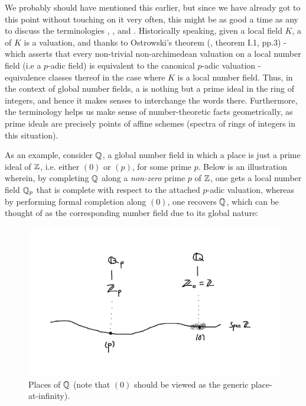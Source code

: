                 \begin{convention} \label{conv: places_and_primes} 
                    We probably should have mentioned this earlier, but since we have already got to this point without touching on it very often, this might be as good a time as any to discuss the terminologies , , and . Historically speaking, given a local field $K$, a  of $K$ is a valuation, and thanks to Ostrowski's theorem (\cite{koblitz_p_adic}, theorem I.1, pp.3) - which asserts that every non-trivial non-archimedean valuation on a local number field (i.e a $p$-adic field) is equivalent to the canonical $p$-adic valuation - equivalence classes thereof in the case where $K$ is a local number field. Thus, in the context of global number fields, a  is nothing but a prime ideal in the ring of integers, and hence it makes senses to interchange the words there. Furthermore, the terminology  helps us make sense of number-theoretic facts geometrically, as prime ideals are precisely points of affine schemes (spectra of rings of integers in this situation).
                    
                    As an example, consider $\mathbb{Q}$, a global number field in which a place is just a prime ideal of $\mathbb{Z}$, i.e. either $(0)$ or $(p)$, for some prime $p$. Below is an illustration wherein, by completing $\mathbb{Q}$ along a \textit{non-zero} prime $p$ of $\mathbb{Z}$, one gets a local number field $\mathbb{Q}_p$ that is complete with respect to the attached $p$-adic valuation, whereas by performing formal completion along $(0)$, one recovers $\mathbb{Q}$, which can be thought of as the corresponding  number field due to its global nature:
                        \begin{figure}[H]
                            \centering
                            \includegraphics[width=\linewidth,height=\textheight,keepaspectratio]{Figures/places of Spec Z.png}
                            \caption{Places of $\mathbb{Q}$ (note that $(0)$ should be viewed as the generic place-at-infinity).}
                            \label{fig: places_of_Q}
                        \end{figure}
                \end{convention}
                
